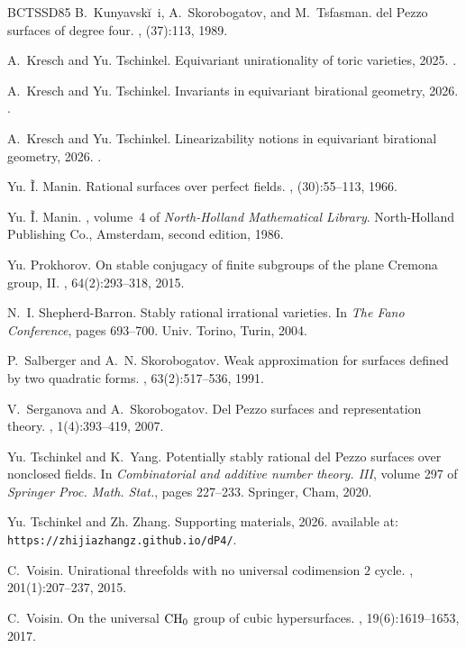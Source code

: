 \documentclass[12pt, reqno]{amsart}
\theoremstyle{plain}
\theoremstyle{remark}
\theoremstyle{definition}
\numberwithin{equation}{section}
\begin{document}
\begin{thebibliography}{BCTSSD85}
B.~Kunyavski\u~i, A.~Skorobogatov, and M.~Tsfasman.
\newblock del {P}ezzo surfaces of degree four.
, (37):113, 1989.

A.~Kresch and Yu. Tschinkel.
\newblock Equivariant unirationality of toric varieties, 2025.
.

A.~Kresch and Yu. Tschinkel.
\newblock Invariants in equivariant birational geometry, 2026.
.

A.~Kresch and Yu. Tschinkel.
\newblock Linearizability notions in equivariant birational geometry, 2026.
.

Yu. \~I. Manin.
\newblock Rational surfaces over perfect fields.
, (30):55--113, 1966.

Yu. \~I. Manin.
, volume~4 of {\em North-Holland Mathematical
  Library}.
\newblock North-Holland Publishing Co., Amsterdam, second edition, 1986.

Yu. Prokhorov.
\newblock On stable conjugacy of finite subgroups of the plane {C}remona group,
  {II}.
, 64(2):293--318, 2015.

N.~I. Shepherd-Barron.
\newblock Stably rational irrational varieties.
\newblock In {\em The {F}ano {C}onference}, pages 693--700. Univ. Torino,
  Turin, 2004.

P.~Salberger and A.~N. Skorobogatov.
\newblock Weak approximation for surfaces defined by two quadratic forms.
, 63(2):517--536, 1991.

V.~Serganova and A.~Skorobogatov.
\newblock Del {P}ezzo surfaces and representation theory.
, 1(4):393--419, 2007.

Yu. Tschinkel and K.~Yang.
\newblock Potentially stably rational del {P}ezzo surfaces over nonclosed
  fields.
\newblock In {\em Combinatorial and additive number theory. {III}}, volume 297
  of {\em Springer Proc. Math. Stat.}, pages 227--233. Springer, Cham, 2020.

Yu. Tschinkel and Zh. Zhang.
\newblock Supporting materials, 2026.
\newblock available at: {\tt https://zhijiazhangz.github.io/dP4/}.

C.~Voisin.
\newblock Unirational threefolds with no universal codimension {$2$} cycle.
, 201(1):207--237, 2015.

C.~Voisin.
\newblock On the universal {$\rm CH_0$} group of cubic hypersurfaces.
, 19(6):1619--1653, 2017.

\end{thebibliography}
\end{document}
